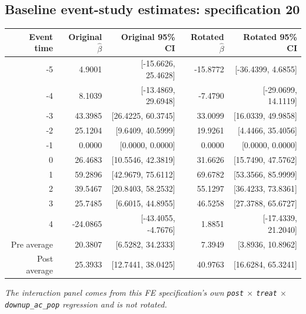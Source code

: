 \documentclass[10pt]{article}
\begin{document}
\subsection*{Baseline event-study estimates: specification 20}
\begin{center}
\scriptsize
\begin{tabular}{r rr rr}
\toprule
Event time & Original $\hat\beta$ & Original 95\% CI & Rotated $\hat\beta$ & Rotated 95\% CI \\
\midrule
-5 & 4.9001 & [-15.6626, 25.4628] & -15.8772 & [-36.4399, 4.6855] \\
-4 & 8.1039 & [-13.4869, 29.6948] & -7.4790 & [-29.0699, 14.1119] \\
-3 & 43.3985 & [26.4225, 60.3745] & 33.0099 & [16.0339, 49.9858] \\
-2 & 25.1204 & [9.6409, 40.5999] & 19.9261 & [4.4466, 35.4056] \\
-1 & 0.0000 & [0.0000, 0.0000] & 0.0000 & [0.0000, 0.0000] \\
0 & 26.4683 & [10.5546, 42.3819] & 31.6626 & [15.7490, 47.5762] \\
1 & 59.2896 & [42.9679, 75.6112] & 69.6782 & [53.3566, 85.9999] \\
2 & 39.5467 & [20.8403, 58.2532] & 55.1297 & [36.4233, 73.8361] \\
3 & 25.7485 & [6.6015, 44.8955] & 46.5258 & [27.3788, 65.6727] \\
4 & -24.0865 & [-43.4055, -4.7676] & 1.8851 & [-17.4339, 21.2040] \\
\midrule
Pre average & 20.3807 & [6.5282, 34.2333] & 7.3949 & [3.8936, 10.8962] \\
Post average & 25.3933 & [12.7441, 38.0425] & 40.9763 & [16.6284, 65.3241] \\
\bottomrule
\end{tabular}
\end{center}
\medskip
\textit{The interaction panel comes from this FE specification's own \texttt{post} $\times$ \texttt{treat} $\times$ \texttt{downup\_ac\_pop} regression and is not rotated.}
\clearpage
\end{document}
